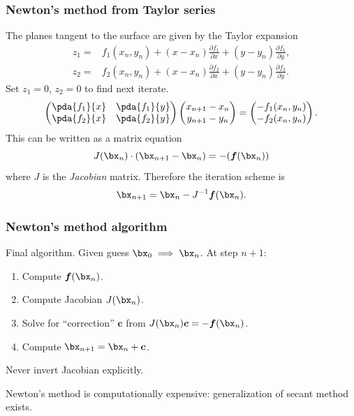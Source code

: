 \documentclass{beamer}
\newcommand{\bfm}[1]{{\boldsymbol{#1}}}
\begin{document}
\begin{frame}
  \frametitle{Newton's method from Taylor series}

  The planes tangent to the surface are given by the Taylor expansion
  \begin{align*}
    z_1 = & f_1 (x_n,y_n) + (x - x_n) \frac{\partial
      f_1}{\partial x}+ (y - y_n) \frac{\partial
      f_1}{\partial y}, \\
    z_2 = &f_2 (x_n,y_n) + (x - x_n) \frac{\partial
      f_2}{\partial x}+ (y - y_n) \frac{\partial
      f_2}{\partial y}.
  \end{align*} \pause
  Set $z_1=0$, $z_2=0$ to find next iterate.
  \begin{align*}
    \begin{pmatrix}
      \pda{f_1}{x} & \pda{f_1}{y} \\ \pda{f_2}{x} & \pda{f_2}{y}
    \end{pmatrix}
    \begin{pmatrix}
      x_{n+1} - x_{n} \\ y_{n+1} - y_{n}
    \end{pmatrix}
    =
    \begin{pmatrix}
      -f_1 (x_n,y_n) \\ -f_2 (x_n,y_n)
    \end{pmatrix}.
  \end{align*}\pause
  This can be written as a matrix equation
  \begin{equation*}
    J (\bx_n) \cdot ( \bx_{n+1} - \bx_n ) = -( \bfm{f}(\bx_n))
  \end{equation*}
  where $J$ is the \emph{Jacobian} matrix. \pause
  Therefore the iteration scheme is
  \begin{equation*}
    \bx_{n+1} = \bx_n - J^{-1} \bfm{f}(\bx_n).
  \end{equation*}

\end{frame}

\begin{frame}
  \frametitle{Newton's method algorithm}

  Final algorithm. Given guess $\bx_0 \implies \bx_n$. At step $n+1$:
  \begin{enumerate}
  \item Compute $\bfm{f}(\bx_n)$.
  \item Compute Jacobian $J (\bx_n)$.
  \item Solve for ``correction'' $\bfm{c}$ from $J (\bx_n) \bfm{c} = -\bfm{f}(\bx_n)$.
  \item Compute $\bx_{n+1} = \bx_n + \bfm{c}$.
  \end{enumerate} \pause

  Never invert Jacobian explicitly.

  \vspace{1ex}

  Newton's method is computationally expensive: generalization of secant method exists.

\end{frame}
\end{document}
